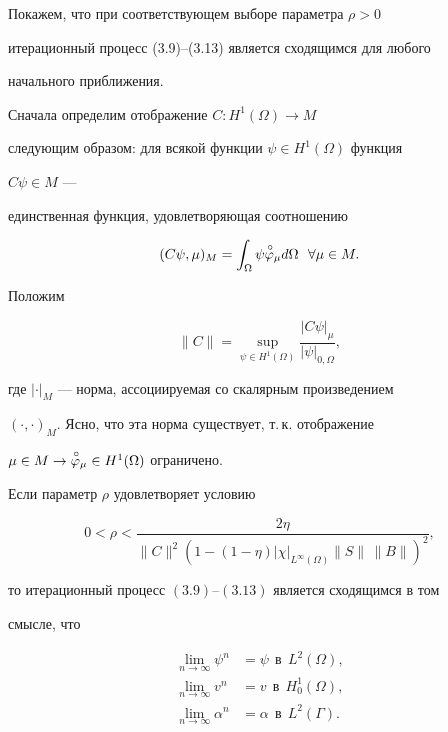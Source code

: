 \medskip


 


Покажем, что при соответствующем выборе параметра $\rho>0$ 


итерационный процесс (3.9)--(3.13) является сходящимся для любого 


начального приближения. 


Сначала определим отображение $C:H^1(\Omega)\to M$ 


следующим образом: для всякой функции $\psi\in H^1(\Omega)$ функция 


$C\psi\in M$ --- 


единственная функция, удовлетворяющая соотношению 


\begin{equation} 


(C\psi,\mu)_M=\int_\Omega \psi\up{\varphi}_\mu 


d\Omega\ \ \forall\mu\in M. 


\end{equation} 


 


Положим 


$$ 


\|C\|=\sup_{\psi\in H^1(\Omega)}\frac{|C\psi|_\mu}{|\psi|_{0,\Omega}}, 


$$ 


где $|\cdot|_M$ --- норма, ассоциируемая со скалярным произведением 


$(\cdot,\cdot)_M$. Ясно, что эта норма существует, т.\,к. отображение 


$\mu\in M\to\overset{\,\circ}{\varphi}{}_\mu\in H^1(\Omega)$ ограничено. 


 


\begin{thm} 


Если параметр $\rho$ удовлетворяет условию 


\begin{equation} 


0<\rho<\frac{2\eta} 


{\|C\|^2(1-(1-\eta)|\chi|_{L^\infty(\Omega)}\|S\|\,\|B\|)^2}, 


\end{equation} 


то итерационный процесс $(3.9)$--$(3.13)$ является сходящимся в том 


смысле, что 


\begin{align*} 


\lim_{n\to\infty}\psi^n&=\psi\ \ \text{в} \ \ L^2(\Omega),\\ 


\lim_{n\to\infty}v^n&=v\ \ \text{в}\ \ H^1_0(\Omega),\\ 


\lim_{n\to\infty}\alpha^n&=\alpha\ \ \text{в}\ \ L^2(\Gamma). 


\end{align*} 


\end{thm} 


